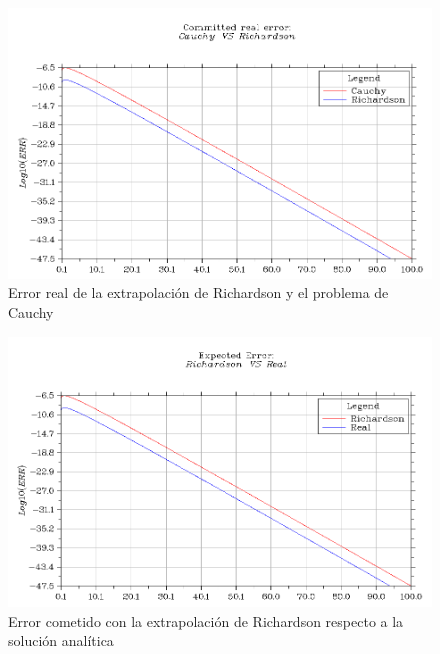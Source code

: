 \documentclass{article}
\begin{document}
	\begin{figure}[h!]
		\begin{center}
			\includegraphics[scale=0.4]{richardson2.png}
			\caption{Error real de la extrapolación de Richardson y el problema de Cauchy}
		\end{center}
	\end{figure}

	\newpage

	\begin{figure}[h!]
		\begin{center}
			\includegraphics[scale=0.4]{richardson3.png}
			\caption{Error cometido con la extrapolación de Richardson respecto a la solución analítica}
		\end{center}
	\end{figure}
	
\end{document}
